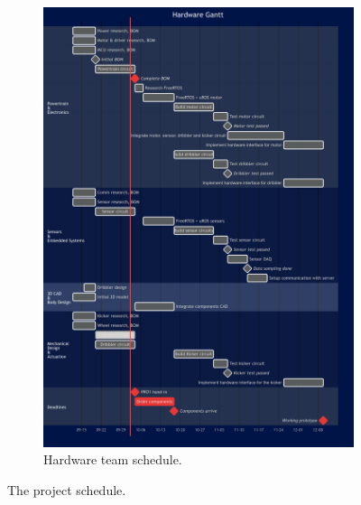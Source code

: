 \begin{figure}
\begin{subfigure}[b]{0.55\textwidth}
       \includegraphics[width=0.95\linewidth]{images/DVA490_hardware_team_project_schedule.png}
       \caption{Hardware team schedule.}
       \label{fig:hardware_schedule}
    \end{subfigure}
    \caption{The project schedule.}
    \label{fig:project_schedule}
\end{figure}



